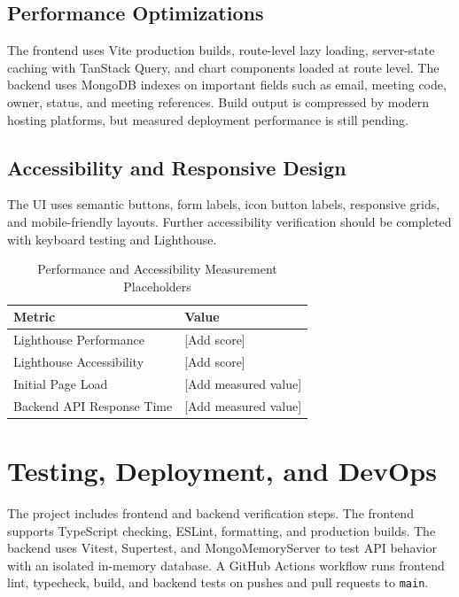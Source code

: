 \documentclass[11pt,a4paper]{article}
\begin{document}
\subsection{Performance Optimizations}
The frontend uses Vite production builds, route-level lazy loading, server-state caching with TanStack Query, and chart components loaded at route level. The backend uses MongoDB indexes on important fields such as email, meeting code, owner, status, and meeting references. Build output is compressed by modern hosting platforms, but measured deployment performance is still pending.

\subsection{Accessibility and Responsive Design}
The UI uses semantic buttons, form labels, icon button labels, responsive grids, and mobile-friendly layouts. Further accessibility verification should be completed with keyboard testing and Lighthouse.

\begin{table}[H]
\centering
\small
{}
\begin{tabularx}{\linewidth}{L{4.2cm} Y}
\toprule
\textbf{Metric} & \textbf{Value}\\
\midrule
Lighthouse Performance & [Add score]\\
Lighthouse Accessibility & [Add score]\\
Initial Page Load & [Add measured value]\\
Backend API Response Time & [Add measured value]\\
\bottomrule
\end{tabularx}
\caption{Performance and Accessibility Measurement Placeholders}
\label{tab:metrics}
\end{table}

\newpage

\section{Testing, Deployment, and DevOps}
The project includes frontend and backend verification steps. The frontend supports TypeScript checking, ESLint, formatting, and production builds. The backend uses Vitest, Supertest, and MongoMemoryServer to test API behavior with an isolated in-memory database. A GitHub Actions workflow runs frontend lint, typecheck, build, and backend tests on pushes and pull requests to \texttt{main}.
\end{document}
